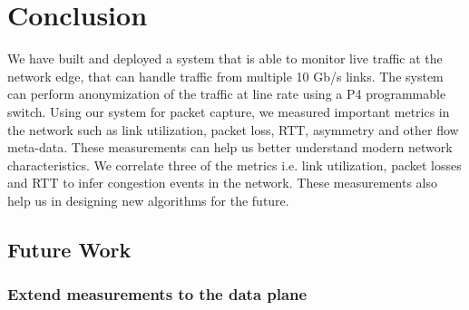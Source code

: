 
\chapter{Conclusion} %

\label{Chapter 5} %






We have built and deployed a system that is able to monitor live traffic at the network edge, that can handle traffic from multiple 10 Gb/s links. The system can perform anonymization of the traffic at line rate using a P4 programmable switch. Using our system for packet capture, we measured important metrics in the network such as link utilization, packet loss, RTT, asymmetry and other flow meta-data. These measurements can  help us better understand modern network characteristics. We correlate three of the metrics i.e. link utilization, packet losses and RTT to infer congestion events in the network. These measurements also help us in designing new algorithms for the future.


\section{Future Work}

\subsection{Extend measurements to the data plane}

